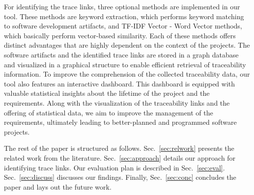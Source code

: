 For identifying the trace links, three optional methods are implemented in our tool. These methods are keyword extraction, which performs keyword matching to software development artifacts, and TF-IDF Vector - Word Vector methods, which basically perform vector-based similarity. Each of these methods offers distinct advantages that are highly dependent on the context of the projects.
The software artifacts and the identified trace links are stored in a graph database and visualized in a graphical structure to enable efficient retrieval of traceability information. To improve the comprehension of the collected traceability data, our tool also features an interactive dashboard. This dashboard is equipped with valuable statistical insights about the lifetime of the project and the requirements. Along with the visualization of the traceability links and the offering of statistical data, we aim to improve the management of the requirements, ultimately leading to better-planned and programmed software projects.

The rest of the paper is structured as follows. Sec.~\ref{sec:relwork} presents the related work from the literature. Sec.~\ref{sec:approach} details our approach for identifying trace links. Our evaluation plan is described in Sec.~\ref{sec:eval}. Sec.~\ref{sec:discuss} discusses our findings. Finally, Sec.~\ref{sec:conc} concludes the paper and lays out the future work.


